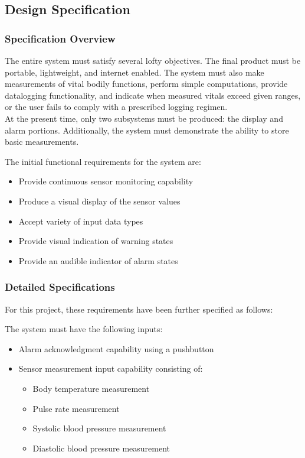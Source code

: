 \documentclass[12pt]{article} %
\begin{document}
\subsection{Design Specification\label{sec:designSpec}}

\subsubsection{Specification Overview}
The entire system must satisfy several lofty objectives. The final product must be portable, lightweight, and internet enabled. The system must also make measurements of vital bodily functions, perform simple computations, provide datalogging functionality, and indicate when measured vitals exceed given ranges, or the user fails to comply with a prescribed logging regimen. \\
At the present time, only two subsystems must be produced: the display and alarm portions. Additionally, the system must demonstrate the ability to store basic measurements. \\

\begin{itemize}[$$]
  \item The initial functional requirements for the system are:
    \begin{itemize}[$\bullet$]
      \item Provide continuous sensor monitoring capability
      \item Produce a visual display of the sensor values
      \item Accept variety of input data types
      \item Provide visual indication of warning states
      \item Provide an audible indicator of alarm states
    \end{itemize}
\end{itemize}

\subsubsection{Detailed Specifications}
For this project, these requirements have been further specified as follows:

\begin{itemize}[$$]
  \item The system must have the following inputs:
    \begin{itemize}[$\bullet$]
      \item Alarm acknowledgment capability using a pushbutton
      \item Sensor measurement input capability consisting of:
	\begin{itemize}
	\item Body temperature measurement
	\item Pulse rate measurement
	\item Systolic blood pressure measurement
	\item Diastolic blood pressure measurement
	\end{itemize}
    \end{itemize}
\end{itemize}
\end{document}
